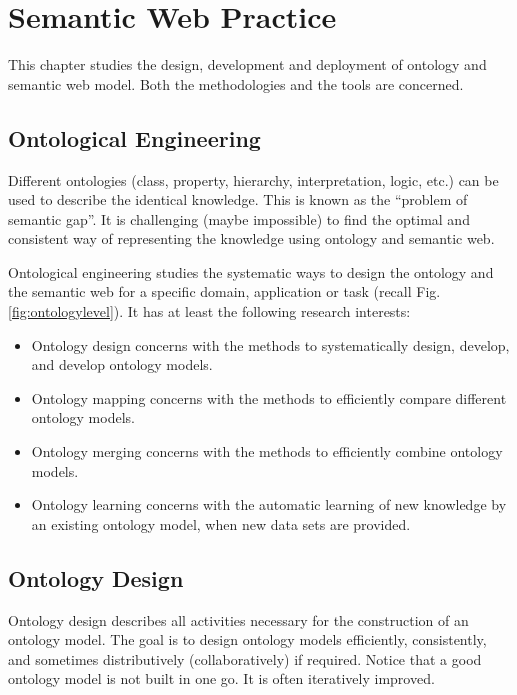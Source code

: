 \chapter{Semantic Web Practice} \label{ch:semanticwebpractice}

This chapter studies the design, development and deployment of ontology and semantic web model. Both the methodologies and the tools are concerned.

\section{Ontological Engineering}

Different ontologies (class, property, hierarchy, interpretation, logic, etc.) can be used to describe the identical knowledge. This is known as the ``problem of semantic gap''. It is challenging (maybe impossible) to find the optimal and consistent way of representing the knowledge using ontology and semantic web. 

Ontological engineering studies the systematic ways to design the ontology and the semantic web for a specific domain, application or task (recall Fig. \ref{fig:ontologylevel}). It has at least the following research interests:
\begin{itemize}
	\item Ontology design concerns with the methods to systematically design, develop, and develop ontology models.
	\item Ontology mapping concerns with the methods to efficiently compare different ontology models.
	\item Ontology merging concerns with the methods to efficiently combine ontology models.
	\item Ontology learning concerns with the automatic learning of new knowledge by an existing ontology model, when new data sets are provided.
\end{itemize}

\section{Ontology Design}

Ontology design describes all activities necessary for the construction of an ontology model. The goal is to design ontology models efficiently, consistently, and sometimes distributively (collaboratively) if required. Notice that a good ontology model is not built in one go. It is often iteratively improved. 

